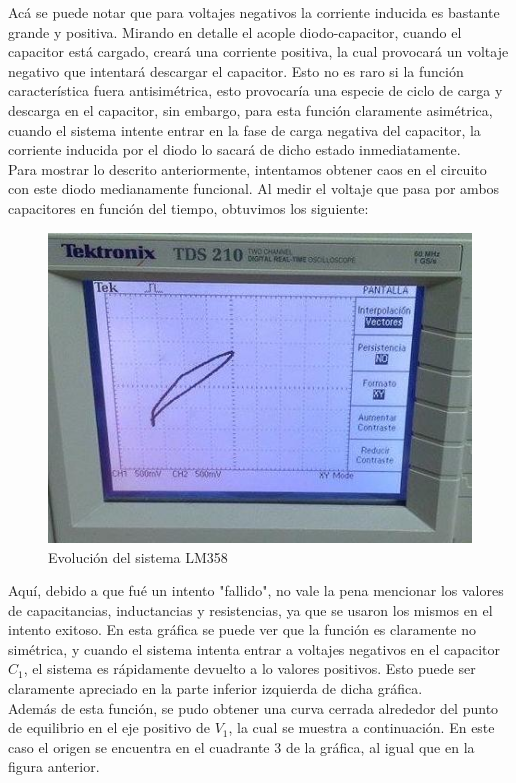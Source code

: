\documentclass[%
 reprint,
 amsmath,amssymb,
 aps,
]{revtex4-1}
\begin{document}
Acá se puede notar que para voltajes negativos la corriente inducida es bastante grande y positiva. Mirando en detalle el acople diodo-capacitor, cuando el capacitor está cargado, creará una corriente positiva, la cual provocará un voltaje negativo que intentará descargar el capacitor. Esto no es raro si la función característica fuera antisimétrica, esto provocaría una especie de ciclo de carga y descarga en el capacitor, sin embargo, para esta función claramente asimétrica, cuando el sistema intente entrar en la fase de carga negativa del capacitor, la corriente inducida por el diodo lo sacará de dicho estado inmediatamente.\\

Para mostrar lo descrito anteriormente, intentamos obtener caos en el circuito con este diodo medianamente funcional. Al medir el voltaje que pasa por ambos capacitores en función del tiempo, obtuvimos los siguiente:\\

\begin{figure}
\centering
\includegraphics[width=0.7\linewidth]{"intento1foto"}
\caption{Evolución del sistema LM358}
\label{fig:intento1foto}
\end{figure}

Aquí, debido a que fué un intento "fallido", no vale la pena mencionar los valores de capacitancias, inductancias y resistencias, ya que se usaron los mismos en el intento exitoso. En esta gráfica se puede ver que la función es claramente no simétrica, y cuando el sistema intenta entrar a voltajes negativos en el capacitor $C_1$, el sistema es rápidamente devuelto a lo valores positivos. Esto puede ser claramente apreciado en la parte inferior izquierda de dicha gráfica.\\

Además de esta función, se pudo obtener una curva cerrada alrededor del punto de equilibrio en el eje positivo de $V_1$, la cual se muestra a continuación. En este caso el origen se encuentra en el cuadrante 3 de la gráfica, al igual que en la figura anterior.\\
\end{document}
